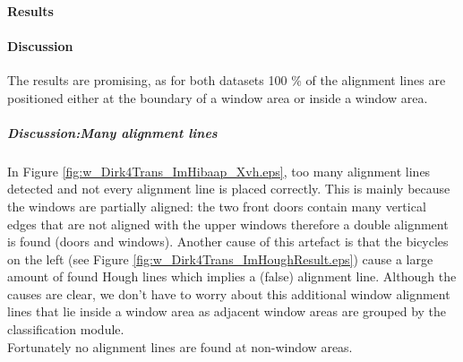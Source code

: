 
\newpage
\paragraph{Results}


\clearpage

\paragraph{Discussion}
The results are promising, as for both datasets 100 \% of the alignment lines
are positioned either at the boundary of a window area or inside a window area.

\subparagraph{Discussion:Many alignment lines}
In Figure \ref{fig:w_Dirk4Trans_ImHibaap_Xvh.eps}, too many alignment lines
detected and not every alignment line is placed correctly.  This is mainly
because the windows are partially aligned: the two front doors contain many
vertical edges that are not aligned with the upper windows therefore a double alignment
is found (doors and windows).  Another cause of this artefact is that the
bicycles on the left (see Figure \ref{fig:w_Dirk4Trans_ImHoughResult.eps}) cause
a large amount of found Hough lines which implies a (false) alignment line.
Although the causes are clear, we don't have to worry about this additional
window alignment lines that lie inside a window area as adjacent window areas
are grouped by the classification module.\\
Fortunately no alignment lines are found at non-window areas.


